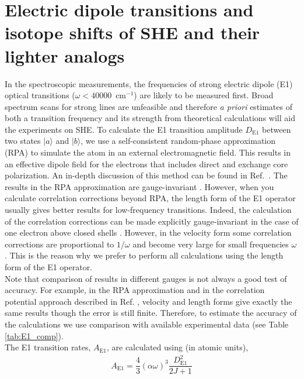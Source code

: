 \documentclass[10pt,a4paper, twoside, openright]{report}
\begin{document}
\section{Electric dipole transitions and isotope shifts of SHE and their lighter analogs} \label{sec:Isoshift}
In the spectroscopic measurements, the frequencies of strong electric dipole (E1) optical transitions ($\omega < 40 000$~cm$^{-1}$) are likely to be measured first. Broad spectrum scans for strong lines are unfeasible and therefore \textit{a priori} estimates of both a transition frequency and its strength from theoretical calculations will aid the experiments on SHE. To calculate the E1 transition amplitude $D_{\text{E1}}$ between two states $|a\rangle$ and $|b\rangle$, we use a self-consistent random-phase approximation (RPA) to simulate the atom in an external electromagnetic field. This results in an effective dipole field for the electrons that includes direct and exchange core polarization. An in-depth discussion of this method can be found in Ref.~\cite{DFSS1986, Dzuba2018}. The results in the  RPA approximation are gauge-invariant \cite{DFSS1986}. However, when you calculate correlation corrections beyond RPA, the length form of the E1 operator usually gives better results for low-frequency transitions. Indeed, the calculation of the correlation corrections can be made explicitly gauge-invariant in the case of one electron above closed shells \cite{DFSS1987_2, DFSS1987}. However, in the velocity form some correlation corrections are proportional to $1/\omega$ and become very large for small frequencies $\omega$  \cite{DFSS1987_2, DFSS1987}. This is the reason why we prefer to perform all calculations using the length form of the E1 operator. \\
\linebreak
Note that comparison of results in different gauges is not always a good test of accuracy. For example, in the RPA approximation and in the correlation potential approach described in Ref. \cite{DFSS1987_2, DFSS1987}, velocity and length forms give exactly the same results though the error is still finite. Therefore, to estimate the accuracy of the calculations we use comparison with available experimental data (see Table \ref{tab:E1_comp}).\\
\linebreak
The E1 transition rates, $A_{\text{E1}}$, are calculated using (in atomic units),
\begin{align} \label{eq:E1}
A_{\text{E1}} = \dfrac{4}{3}\left(\alpha \omega\right)^3\dfrac{ D_{\text{E1}}^2}{2J + 1}
\end{align}
\end{document}
